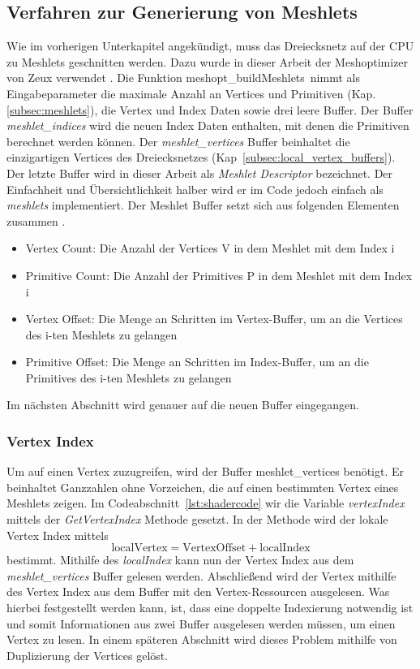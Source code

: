 \subsection{Verfahren zur Generierung von Meshlets}
\label{subsec:standard_meshshaderimpl}
Wie im vorherigen Unterkapitel angekündigt, muss das Dreiecksnetz auf der CPU zu Meshlets geschnitten werden. 
Dazu wurde in dieser Arbeit der Meshoptimizer von Zeux verwendet \cite{Zeux}.
Die Funktion \glqq meshopt\_buildMeshlets\grqq\ nimmt als Eingabeparameter die maximale Anzahl an Vertices und Primitiven (Kap.\ref{subsec:meshlets}), die Vertex und Index Daten sowie drei leere Buffer.
Der Buffer \textit{meshlet\_indices} wird die neuen Index Daten enthalten, mit denen die Primitiven berechnet werden können.
Der \textit{meshlet\_vertices} Buffer beinhaltet die einzigartigen Vertices des Dreiecksnetzes (Kap~\ref{subsec:local_vertex_buffers}).
Der letzte Buffer wird in dieser Arbeit als \textit{Meshlet Descriptor} bezeichnet.
Der Einfachheit und Übersichtlichkeit halber wird er im Code jedoch einfach als \textit{meshlets} implementiert.
Der Meshlet Buffer setzt sich aus folgenden Elementen zusammen \cite{Jensen2023}.
\begin{itemize}
\item Vertex Count: Die Anzahl der Vertices V in dem Meshlet mit dem Index i
\item Primitive Count: Die Anzahl der Primitives P in dem Meshlet mit dem Index i
\item Vertex Offset: Die Menge an Schritten im Vertex-Buffer, um an die Vertices des i-ten Meshlets zu gelangen
\item Primitive Offset: Die Menge an Schritten im Index-Buffer, um an die Primitives des i-ten Meshlets zu gelangen
\end{itemize} 
Im nächsten Abschnitt wird genauer auf die neuen Buffer eingegangen. \newline

\subsubsection*{Vertex Index}
Um auf einen Vertex zuzugreifen, wird der Buffer meshlet\_vertices benötigt.
Er beinhaltet Ganzzahlen ohne Vorzeichen, die auf einen bestimmten Vertex eines Meshlets zeigen.
Im Codeabschnitt~\ref{lst:shadercode} wir die Variable \textit{vertexIndex} mittels der \textit{GetVertexIndex} Methode gesetzt.
In der Methode wird der lokale Vertex Index mittels
\begin{equation*}
\text{localVertex} = \text{VertexOffset} + \text{localIndex}
\end{equation*}
bestimmt. \newline
Mithilfe des \textit{localIndex} kann nun der Vertex Index aus dem \textit{meshlet\_vertices} Buffer gelesen werden.
Abschließend wird der Vertex mithilfe des Vertex Index aus dem Buffer mit den Vertex-Ressourcen ausgelesen.
Was hierbei festgestellt werden kann, ist, dass eine doppelte Indexierung notwendig ist und somit Informationen aus zwei Buffer ausgelesen werden müssen, um einen Vertex zu lesen.
In einem späteren Abschnitt wird dieses Problem mithilfe von Duplizierung der Vertices gelöst.

